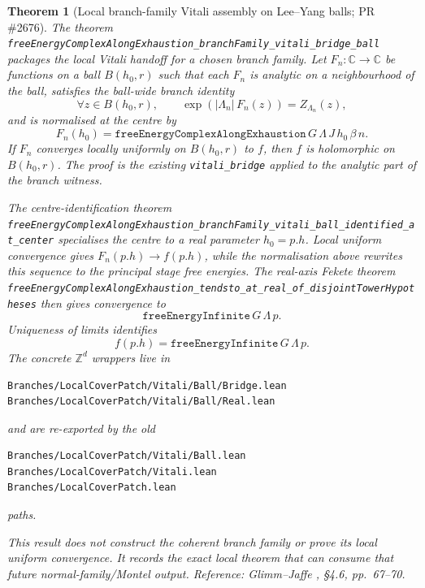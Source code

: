 \documentclass[a4paper,11pt]{article}
\newtheorem{theorem}{Theorem}
\begin{document}
\begin{theorem}[Local branch-family Vitali assembly on Lee--Yang balls; PR \#2676]
The theorem
\texttt{freeEnergyComplexAlongExhaustion\_branchFamily\_vitali\_bridge\_ball}
packages the local Vitali handoff for a chosen branch family.  Let
$F_n:\mathbb C\to\mathbb C$ be functions on a ball $B(h_0,r)$ such that each
$F_n$ is analytic on a neighbourhood of the ball, satisfies the ball-wide
branch identity
\[
  \forall z\in B(h_0,r),\qquad
  \exp(|\Lambda_n|\,F_n(z))=Z_{\Lambda_n}(z),
\]
and is normalised at the centre by
\[
  F_n(h_0)=
  \texttt{freeEnergyComplexAlongExhaustion}\,G\,\Lambda\,J\,h_0\,\beta\,n .
\]
If $F_n$ converges locally uniformly on $B(h_0,r)$ to $f$, then $f$ is
holomorphic on $B(h_0,r)$.  The proof is the existing
\texttt{vitali\_bridge} applied to the analytic part of the branch witness.

The centre-identification theorem
\texttt{freeEnergyComplexAlongExhaustion\_branchFamily\_vitali\_ball\_identified\_at\_center}
specialises the centre to a real parameter $h_0=p.h$.  Local uniform
convergence gives $F_n(p.h)\to f(p.h)$, while the normalisation above rewrites
this sequence to the principal stage free energies.  The real-axis Fekete
theorem
\texttt{freeEnergyComplexAlongExhaustion\_tendsto\_at\_real\_of\_disjointTowerHypotheses}
then gives convergence to
\[
  \texttt{freeEnergyInfinite}\,G\,\Lambda\,p .
\]
Uniqueness of limits identifies
\[
  f(p.h)=\texttt{freeEnergyInfinite}\,G\,\Lambda\,p .
\]
The concrete $\mathbb Z^d$ wrappers live in
\begin{Verbatim}[fontsize=\footnotesize]
Branches/LocalCoverPatch/Vitali/Ball/Bridge.lean
Branches/LocalCoverPatch/Vitali/Ball/Real.lean
\end{Verbatim}
and are re-exported by the old
\begin{Verbatim}[fontsize=\footnotesize]
Branches/LocalCoverPatch/Vitali/Ball.lean
Branches/LocalCoverPatch/Vitali.lean
Branches/LocalCoverPatch.lean
\end{Verbatim}
paths.

This result does not construct the coherent branch family or prove its local
uniform convergence.  It records the exact local theorem that can consume that
future normal-family/Montel output.
Reference: Glimm--Jaffe \cite{glimm-jaffe}, \S 4.6, pp.~67--70.
\end{theorem}
\end{document}
